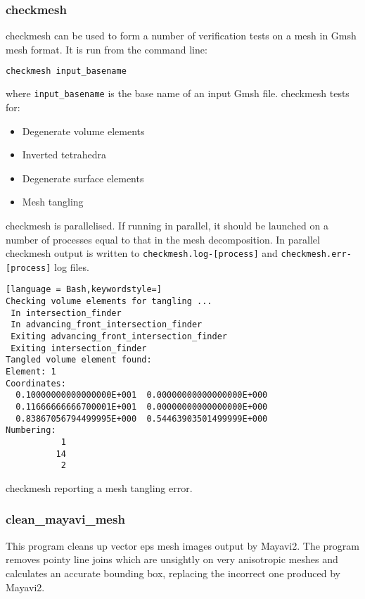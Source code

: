 \subsubsection{checkmesh}
\label{sec:checkmesh}
checkmesh can be used to form a number of verification tests on a mesh in Gmsh mesh
format. It is run from the command line:
\begin{lstlisting}[language = Bash]
checkmesh input_basename
\end{lstlisting}
where \lstinline[language = Bash]+input_basename+ is the base name of an input Gmsh file. checkmesh tests for:
\begin{itemize}
\item Degenerate volume elements
\item Inverted tetrahedra
\item Degenerate surface elements
\item Mesh tangling
\end{itemize}

checkmesh is parallelised. If running in parallel, it should be launched on a number of processes equal to that in the mesh decomposition. In parallel checkmesh output is written to
\lstinline[language = Bash]+checkmesh.log-[process]+ and \lstinline[language = Bash]+checkmesh.err-[process]+ log files.

\begin{example}
\begin{lstlisting}[language = Bash,keywordstyle=]
Checking volume elements for tangling ...
 In intersection_finder
 In advancing_front_intersection_finder
 Exiting advancing_front_intersection_finder
 Exiting intersection_finder
Tangled volume element found:
Element: 1
Coordinates:
  0.10000000000000000E+001  0.00000000000000000E+000
  0.11666666666700001E+001  0.00000000000000000E+000
  0.83867056794499995E+000  0.54463903501499999E+000
Numbering:
           1
          14
           2
\end{lstlisting}
\caption{checkmesh reporting a mesh tangling error.}
\end{example}


\subsubsection{clean\_mayavi\_mesh}
\label{sec:clean_mayavi_mesh}

This program cleans up vector eps mesh images output by Mayavi2. The program
removes pointy line joins which are unsightly on very anisotropic meshes and
calculates an accurate bounding box, replacing the incorrect one produced by Mayavi2.

